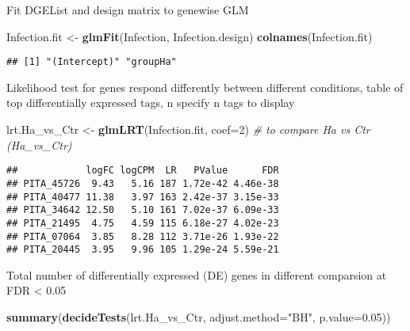 \documentclass[
]{article}
\newenvironment{Shaded}{\begin{snugshade}}{\end{snugshade}}
\newcommand{\AttributeTok}[1]{\textcolor[rgb]{0.13,0.29,0.53}{#1}}
\newcommand{\CommentTok}[1]{\textcolor[rgb]{0.56,0.35,0.01}{\textit{#1}}}
\newcommand{\DecValTok}[1]{\textcolor[rgb]{0.00,0.00,0.81}{#1}}
\newcommand{\FloatTok}[1]{\textcolor[rgb]{0.00,0.00,0.81}{#1}}
\newcommand{\FunctionTok}[1]{\textcolor[rgb]{0.13,0.29,0.53}{\textbf{#1}}}
\newcommand{\NormalTok}[1]{#1}
\newcommand{\OtherTok}[1]{\textcolor[rgb]{0.56,0.35,0.01}{#1}}
\newcommand{\SpecialCharTok}[1]{\textcolor[rgb]{0.81,0.36,0.00}{\textbf{#1}}}
\newcommand{\StringTok}[1]{\textcolor[rgb]{0.31,0.60,0.02}{#1}}
\begin{document}
Fit DGEList and design matrix to genewise GLM

\begin{Shaded}
\begin{Highlighting}[]
\NormalTok{Infection.fit }\OtherTok{\textless{}{-}} \FunctionTok{glmFit}\NormalTok{(Infection, Infection.design)}
\FunctionTok{colnames}\NormalTok{(Infection.fit)}
\end{Highlighting}
\end{Shaded}

\begin{verbatim}
## [1] "(Intercept)" "groupHa"
\end{verbatim}

Likelihood test for genes respond differently between different
conditions, table of top differentially expressed tags, n specify n tags
to display

\begin{Shaded}
\begin{Highlighting}[]
\NormalTok{lrt.Ha\_vs\_Ctr }\OtherTok{\textless{}{-}} \FunctionTok{glmLRT}\NormalTok{(Infection.fit, }\AttributeTok{coef=}\DecValTok{2}\NormalTok{)  }\CommentTok{\# to compare Ha vs Ctr (Ha\_vs\_Ctr)}
\end{Highlighting}
\end{Shaded}

\begin{Shaded}
\end{Shaded}

\begin{verbatim}
##            logFC logCPM  LR   PValue      FDR
## PITA_45726  9.43   5.16 187 1.72e-42 4.46e-38
## PITA_40477 11.38   3.97 163 2.42e-37 3.15e-33
## PITA_34642 12.50   5.10 161 7.02e-37 6.09e-33
## PITA_21495  4.75   4.59 115 6.18e-27 4.02e-23
## PITA_07064  3.85   8.28 112 3.71e-26 1.93e-22
## PITA_20445  3.95   9.96 105 1.29e-24 5.59e-21
\end{verbatim}

Total number of differentially expressed (DE) genes in different
comparsion at FDR \textless{} 0.05

\begin{Shaded}
\begin{Highlighting}[]
\FunctionTok{summary}\NormalTok{(}\FunctionTok{decideTests}\NormalTok{(lrt.Ha\_vs\_Ctr, }\AttributeTok{adjust.method=}\StringTok{"BH"}\NormalTok{, }\AttributeTok{p.value=}\FloatTok{0.05}\NormalTok{))}
\end{Highlighting}
\end{Shaded}
\end{document}
